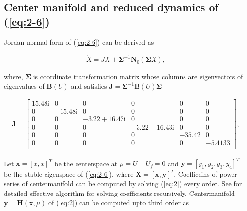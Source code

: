 \documentclass[openacc]{rsproca_new}%
\def\vec#1{\ensuremath{\mathbf{#1}}}
\newcommand{\Eref}[1]{(\ref{#1})}
\begin{document}
\begin{appendices}
\gdef\thesection{Appendix \Alph{section}}

\section{Center manifold and reduced dynamics of \Eref{eq:2-6}} \label{ap1}
Jordan normal form of \Eref{eq:2-6} can be derived as

\begin{align} \label{A1}
\dot X=JX+\vec{\Sigma}^{-1} \vec{N}_0(\vec{\Sigma} X),
\end{align}

\noindent where, $\vec{\Sigma}$ is coordinate transformation matrix whose columns are eigenvectors of eigenvalues of $\vec{B}(U)$ and satisfies $\vec{J}=\vec{\Sigma}^{-1}\vec{B}(U)\vec{\Sigma}$

\begin{align}
\vec{J}=
\begin{bmatrix}
   15.48 \textrm{i}       & 0 & 0 & 0 & 0 & 0 \\
    0       & -15.48 \textrm{i} & 0 & 0 & 0 & 0 \\
    0       & 0 & -3.22+16.43\textrm{i} & 0 & 0 & 0\\
    0       & 0 & 0 & -3.22-16.43\textrm{i} & 0 & 0\\
    0       & 0 & 0 & 0 & -35.42 & 0\\
    0       & 0 & 0 & 0 & 0 & -5.4133\\
\end{bmatrix},
\end{align}

\noindent Let $\vec{x}=[x,\bar x]^T$ be the centerspace at $\mu=U-U_f=0$ and $\vec y=[y_1,y_2,y_3,y_4]^T$ be the stable eigenspace of \Eref{eq:2-6}, where $\vec{X}=[\vec{x},\vec{y}]^T$. Coefficeins of power series of centermanifold can be computed by solving \Eref{eq:2} every order. See \cite{bi1999symbolic} for detailed effective algorithm for solving coefficients recursively. Centermanifold $\vec y=\vec H(\vec x,\mu)$ of \Eref{eq:2} can be computed upto third order as



\end{appendices}
\end{document}
